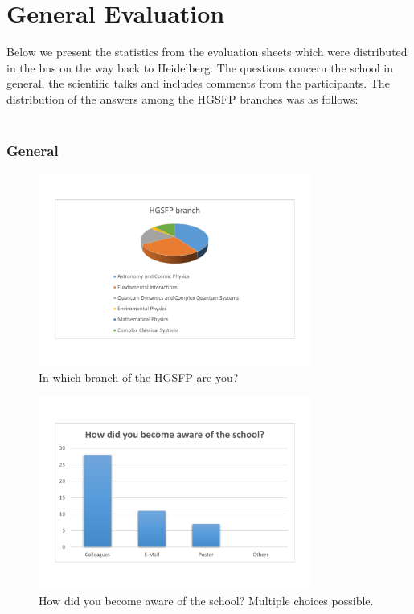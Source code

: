 \documentclass[11pt,a4paper]{article}
\numberwithin{equation}{section}
\numberwithin{table}{section}\setlength{\multlinegap}{25pt}
\begin{document}
\section{General Evaluation}
Below we present the statistics from the evaluation sheets which were distributed in the bus on the way back to Heidelberg. The questions concern the school in general, the scientific talks and includes comments from the participants. The distribution of the answers among the HGSFP branches was as follows: \\ \\

\subsubsection{General}

\begin{figure}[H]
\centering
\includegraphics[width=0.8\textwidth]{eval/general/hgsfp_branch.pdf}
\caption{In which branch of the HGSFP are you?}
\end{figure}
\begin{figure}[H]
\centering
\includegraphics[width=0.8\textwidth]{eval/general/how_did_you_become_aware.pdf}
\caption{How did you become aware of the school? Multiple choices possible.}
\end{figure}
\end{document}
